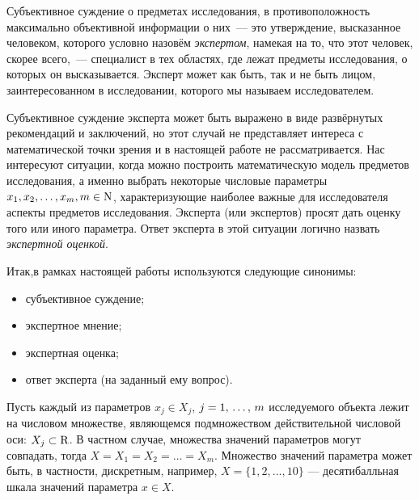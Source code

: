 Субъективное суждение о предметах исследования, в противоположность максимально объективной информации о них~--- это утверждение, высказанное человеком, которого  условно назовём {\sl экспертом}, намекая на то, что этот человек, скорее всего,~--- специалист в тех областях, где лежат предметы исследования, о которых он высказывается. Эксперт может как быть, так и не быть лицом, заинтересованном в исследовании, которого мы называем исследователем.

Субъективное суждение эксперта может быть выражено в виде развёрнутых рекомендаций и заключений, но этот случай не представляет интереса с математической точки зрения и в настоящей работе не рассматривается.  Нас интересуют ситуации, когда можно построить математическую модель предметов исследования, а именно выбрать некоторые числовые параметры $x_1, x_2, \ldots, x_m, m \in {\mathrm{N}}$, характеризующие наиболее важные для исследователя аспекты предметов исследования. Эксперта (или экспертов) просят дать  оценку того или иного параметра. Ответ эксперта в этой ситуации логично назвать {\sl экспертной оценкой}. 

Итак,в рамках настоящей работы используются следующие синонимы: 
\begin{itemize}
	\item субъективное суждение;
	\item экспертное мнение;
	\item экспертная оценка;
	\item ответ эксперта (на заданный ему вопрос). 
 \end{itemize}
 
Пусть каждый из параметров $x_j \in X_j$,  $j = 1,\, \ldots,\, m$ исследуемого объекта лежит на числовом множестве, являющемся подмножеством действительной числовой оси: $X_j \subset {\mathrm{R}}$. В частном случае, множества значений параметров могут совпадать, тогда $X = X_1 = X_2 = \ldots = X_m$. Множество значений параметра может быть, в частности, дискретным, например, $X = \{1, 2, ..., 10\}$ --- десятибалльная шкала значений параметра $x \in X$.

